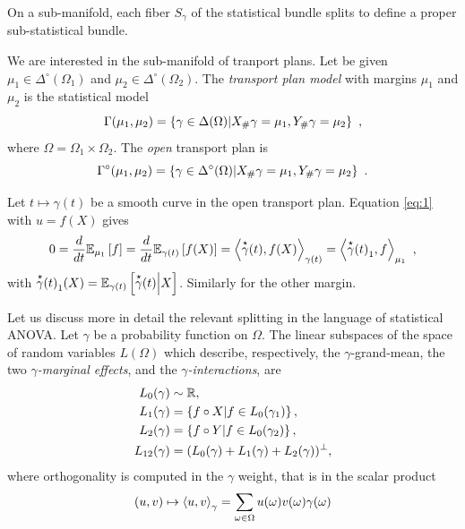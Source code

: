 \documentclass[runningheads]{llncs}
\begin{document}
On a sub-manifold, each fiber $S_\gamma$ of the
statistical bundle splits to define a proper sub-statistical bundle. 

We are interested in the sub-manifold of tranport plans. Let be given
$\mu_1 \in \Delta^\circ(\Omega_1)$ and $\mu_2 \in
\Delta^\circ(\Omega_2)$. The \emph{transport plan model} with margins $\mu_1$ and $\mu_2$ is the statistical model
%
  \begin{equation*}
    \Gamma(\mu_1,\mu_2) = \setof{\gamma \in \Delta(\Omega)}{X_\# \gamma = \mu_1, Y_\# \gamma = \mu_2} \ ,
  \end{equation*}
%
where $\Omega=\Omega_1 \times \Omega_2$. The \emph{open} transport plan is 
%
  \begin{equation*}
    \Gamma^\circ(\mu_1,\mu_2) = \setof{\gamma \in \Delta^\circ(\Omega)}{X_\# \gamma = \mu_1, Y_\# \gamma = \mu_2} \ .
  \end{equation*}

  Let $t \mapsto \gamma(t)$ be a smooth curve in the open transport
  plan. Equation \eqref{eq:1} with $u = f(X)$ gives
  \begin{equation*}
  0 = \derivby t \expectat {\mu_1} f =  \derivby t \expectat
  {\gamma(t)} {f(X)} = \scalarat {\gamma(t)} {\velocity \gamma(t)}
  {f(X)} = \scalarat {\mu_1} {{\velocity \gamma(t)}_1} f \ , 
  \end{equation*}
with ${\velocity \gamma(t)}_1(X) = \condexpectat {\gamma(t)} {\velocity
  \gamma(t)} X$. Similarly for the other margin.

Let us discuss more in detail the relevant splitting in the language
of statistical ANOVA. Let $\gamma$ be
a probability function on $\Omega$. The linear subspaces of the space
of random variables $L(\Omega)$ which describe, respectively, the
$\gamma$-grand-mean, the two \emph{$\gamma$-marginal effects}, and
the \emph{$\gamma$-interactions}, are
%
\begin{equation}\label{eq:ANOVA-spaces}
\begin{aligned}
  L_0(\gamma) &\sim \reals, \\
  L_1(\gamma) &= \setof{f\circ X}{f \in L_0(\gamma_1)},\\
  L_2(\gamma) &= \setof{f\circ Y}{f \in L_0(\gamma_2)},\\
  L_{12}(\gamma) &= (L_0(\gamma) + L_1(\gamma) + L_2(\gamma))^\perp,
\end{aligned}
\end{equation}
%
where orthogonality is computed in the $\gamma$ weight, that is in the scalar product
\begin{equation*}
  (u,v) \mapsto \scalarat \gamma u v = \sum_{\omega\in\Omega}u(\omega)v(\omega)
  \gamma(\omega)\end{equation*}
\end{document}
